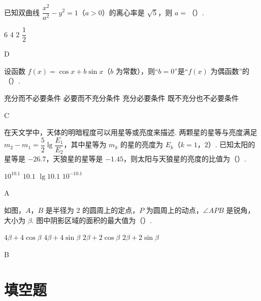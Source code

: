 \begin{problem}
已知双曲线 \(\dfrac{x^2}{a^2}-y^2=1\)（\(a>0\)）的离心率是 \(\sqrt5\)，则 \(a=\)（\quad）.

\choices
    {\(6\)}
    {\(4\)}
    {\(2\)}
    {\(\dfrac12\)}
\end{problem}

\begin{answer}
D
\end{answer}

\begin{problem}
设函数 \(f(x)=\cos x+b\sin x\)（\(b\) 为常数），则“\(b=0\)”是“\(f(x)\) 为偶函数”的（\quad）.

\choices
    {充分而不必要条件}
    {必要而不充分条件}
    {充分必要条件}
    {既不充分也不必要条件}
\end{problem}

\begin{answer}
C
\end{answer}

\begin{problem}
在天文学中，天体的明暗程度可以用星等或亮度来描述. 两颗星的星等与亮度满足 \(m_2-m_1=\dfrac52\lg\dfrac{E_1}{E_2}\)，其中星等为 \(m_k\) 的星的亮度为 \(E_k\)（\(k=1\)，\(2\)）. 已知太阳的星等是 \(-26.7\)，天狼星的星等是 \(-1.45\)，则太阳与天狼星的亮度的比值为（\quad）.

\choices
    {\(10^{10.1}\)}
    {\(10.1\)}
    {\(\lg 10.1\)}
    {\(10^{-10.1}\)}
\end{problem}

\begin{answer}
A
\end{answer}

\begin{problem}
如图，\(A\)，\(B\) 是半径为 \(2\) 的圆周上的定点，\(P\) 为圆周上的动点，\(\angle APB\) 是锐角，大小为 \(\beta\). 图中阴影区域的面积的最大值为（\quad）.


\choices
    {\(4\beta+4\cos\beta\)}
    {\(4\beta+4\sin\beta\)}
    {\(2\beta+2\cos\beta\)}
    {\(2\beta+2\sin\beta\)}
\end{problem}

\begin{answer}
B
\end{answer}

\section{填空题}

